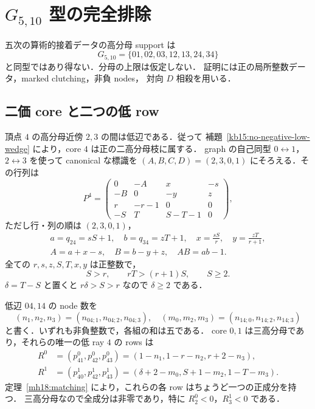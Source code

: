\section{\texorpdfstring{$G_{5,10}$}{G5,10} 型の完全排除}
\label{gten18:section}

\begin{theorem}[$G_{5,10}$ の障害]
\label{gten18:no-support}
五次の算術的接着データの高分母 support は
\[
 G_{5,10}=\{01,02,03,12,13,24,34\}
\]
と同型ではあり得ない．分母の上限は仮定しない．
証明には正の局所整数データ，marked clutching，非負 nodes，
対向 $D$ 相殺を用いる．
\end{theorem}

\subsection{二価 core と二つの低 row}

頂点 $4$ の高分母近傍 $2,3$ の間は低辺である．従って
補題~\ref{kb15:no-negative-low-wedge} により，core $4$ は正の二高分母枝に属する．
graph の自己同型 $0\leftrightarrow1$，$2\leftrightarrow3$ を使って
canonical な標識を $(A,B,C,D)=(2,3,0,1)$ にそろえる．その行列は
\begin{equation}\label{gten18:central-matrix}
 P^4=
 \begin{pmatrix}
 0&-A&x&-s\\
 -B&0&-y&z\\
 r&-r-1&0&0\\
 -S&T&S-T-1&0
 \end{pmatrix},
\end{equation}
ただし行・列の順は $(2,3,0,1)$，
\[
 \begin{gathered}
 a=q_{24}=sS+1,\quad b=q_{34}=zT+1,\quad
 x=\frac{sS}{r},\quad y=\frac{zT}{r+1},\\
 A=a+x-s,\quad B=b-y+z,\quad AB=ab-1.
 \end{gathered}
\]
全ての $r,s,z,S,T,x,y$ は正整数で，
\[
 S>r,\qquad rT>(r+1)S,\qquad S\ge2.
\]
$\delta=T-S$ と置くと $r\delta>S>r$ なので $\delta\ge2$ である．

低辺 $04,14$ の node 数を
\[
 (n_1,n_2,n_3)=(n_{04;1},n_{04;2},n_{04;3}),\quad
 (m_0,m_2,m_3)=(n_{14;0},n_{14;2},n_{14;3})
\]
と書く．いずれも非負整数で，各組の和は五である．
core $0,1$ は三高分母であり，それらの唯一の低 ray $4$ の rows は
\begin{align}
 R^0&=(p^0_{41},p^0_{42},p^0_{43})
       =(1-n_1, 1-r-n_2, r+2-n_3),\label{gten18:R0}\\
 R^1&=(p^1_{40},p^1_{42},p^1_{43})
       =(\delta+2-m_0, S+1-m_2, 1-T-m_3).
       \label{gten18:R1}
\end{align}
定理~\ref{mh18:matching} により，これらの各 row はちょうど一つの正成分を持つ．
三高分母なので全成分は非零であり，特に
$R^0_2<0$，$R^1_3<0$ である．

